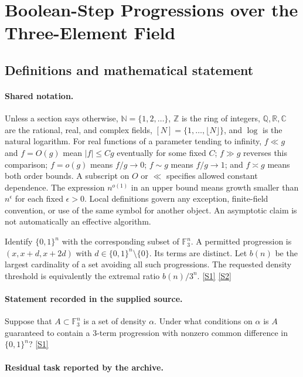 \documentclass[11pt,a4paper]{article}
\newcommand{\N}{\mathbb{N}}
\newcommand{\Z}{\mathbb{Z}}
\newcommand{\Q}{\mathbb{Q}}
\newcommand{\R}{\mathbb{R}}
\newcommand{\C}{\mathbb{C}}
\newcommand{\F}{\mathbb{F}}
\newcommand{\sref}[2]{\hyperlink{source:#1:#2}{[S#2]}}
\begin{document}
\section{Boolean-Step Progressions over the Three-Element Field}\label{statement}


\subsection{Definitions and mathematical statement}

\paragraph{Shared notation.}Unless a section says otherwise, $\N=\{1,2,\ldots\}$,
$\Z$ is the ring of integers, $\Q,\R,\C$ are the rational, real, and complex
fields, $[N]=\{1,\ldots,\lfloor N\rfloor\}$, and $\log$ is the natural
logarithm. For real functions of a parameter tending to infinity,
$f\ll g$ and $f=O(g)$ mean $|f|\leq Cg$ eventually for some fixed $C$;
$f\gg g$ reverses this comparison; $f=o(g)$ means $f/g\to0$;
$f\sim g$ means $f/g\to1$; and $f\asymp g$ means both order bounds.
A subscript on $O$ or $\ll$ specifies allowed constant dependence.
The expression $n^{o(1)}$ in an upper bound means growth smaller than
$n^\epsilon$ for each fixed $\epsilon>0$. Local definitions govern any
exception, finite-field convention, or use of the same symbol for another
object. An asymptotic claim is not automatically an effective algorithm.



Identify $\{0,1\}^n$ with the corresponding subset of $\F_3^n$. A permitted progression is $(x,x+d,x+2d)$ with $d\in\{0,1\}^n\setminus\{0\}$. Its terms are distinct. Let $b(n)$ be the largest cardinality of a set avoiding all such progressions. The requested density threshold is equivalently the extremal ratio $b(n)/3^n$. \sref{statement}{1} \sref{statement}{2}

\paragraph{Statement recorded in the supplied source.}
Suppose that $A \subset \mathbb{F}_3^n$ is a set of density $\alpha$. Under what conditions on $\alpha$ is $A$ guaranteed to contain a 3-term progression with nonzero common difference in $\{0, 1\}^n$? \sref{statement}{1}

\paragraph{Residual task reported by the archive.}
\end{document}
